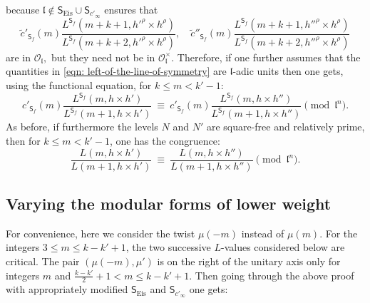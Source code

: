 \documentclass[11pt]{amsart}
\begin{document}
because $\mathfrak{l} \not\in\mathsf{S}_{\text{Eis}} \cup \mathsf{S}_{c'_\infty}$ ensures that
\begin{equation}
	\tilde{c}'_{\mathsf{S}_f}(m)\dfrac{L^{\mathsf{S}_f}(m+k+1, h'^\rho \times h^\rho)}{L^{\mathsf{S}_f}(m+k+2, h'^\rho \times h^\rho)}, \quad
	\tilde{c}''_{\mathsf{S}_f}(m)\dfrac{L^{\mathsf{S}_f}(m+k+1, h''^\rho \times h^\rho)}{L^{\mathsf{S}_f}(m+k+2, h''^\rho \times h^\rho)} 
	\label{eqn: left-of-the-line-of-symmetry}
\end{equation}
are in $\mathcal{O}_\mathfrak{l},$ but they  need not be in $\mathcal{O}_\mathfrak{l}^\times.$ 
Therefore, if one further assumes that the quantities in \eqref{eqn: left-of-the-line-of-symmetry} 
are $\mathfrak{l}$-adic units then one gets, using the functional equation, for $k\leq m < k'-1$: 
\begin{equation*}
	c'_{\mathsf{S}_f}(m)\dfrac{L^{\mathsf{S}_f}(m, h \times h')}{L^{\mathsf{S}_f}(m+1, h \times h')}  \ \equiv \ 
	c'_{\mathsf{S}_f}(m)\dfrac{L^{\mathsf{S}_f}(m, h \times h'')}{L^{\mathsf{S}_f}(m+1, h \times h'')} \pmod{\mathfrak{l}^n}. 
\end{equation*}
As before, if furthermore the levels $N$ and $N'$ are square-free and relatively prime, then for $k\leq m <k'-1$, one has the congruence: 
\begin{equation*}
	\dfrac{L(m, h \times h')}{L(m+1, h \times h')} \ \equiv \  \dfrac{L(m, h \times h'')}{L(m+1, h\times h'')} \pmod{\mathfrak{l}^n}.
\end{equation*}





\medskip
\subsection{Varying the modular forms of lower weight}

For convenience, here we consider the twist $\mu(-m)$ instead of $\mu(m)$. 
For the integers $ 3 \leq m \leq k-k'+1 $, the two successive $L$-values considered below are critical. 
The pair $(\mu(-m), \mu')$ is on the right of the unitary axis only for integers $m$ and $\frac{k-k'}{2} + 1 < m \leq k-k'+1.$ 
Then going through the above proof with appropriately modified $\mathsf{S}_{\text{Eis}}$ and $\mathsf{S}_{c'_\infty}$ one gets: 
\end{document}
